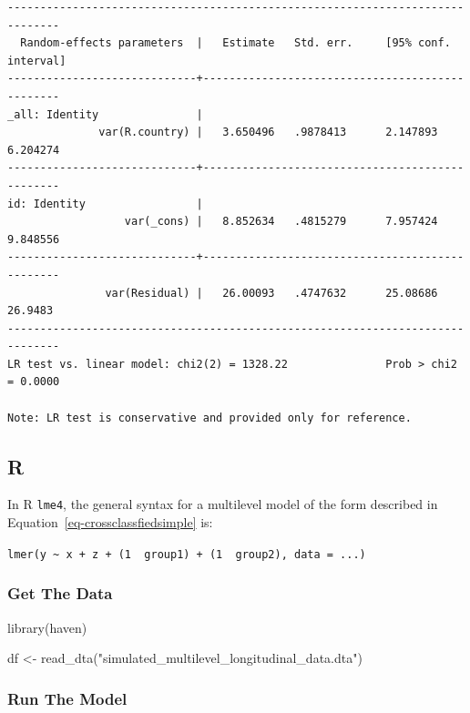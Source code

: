 \documentclass[
  letterpaper,
  DIV=11,
  numbers=noendperiod,
  oneside]{scrreprt}
\newenvironment{Shaded}{\begin{snugshade}}{\end{snugshade}}
\newcommand{\FunctionTok}[1]{\textcolor[rgb]{0.28,0.35,0.67}{#1}}
\newcommand{\NormalTok}[1]{\textcolor[rgb]{0.00,0.23,0.31}{#1}}
\newcommand{\OtherTok}[1]{\textcolor[rgb]{0.00,0.23,0.31}{#1}}
\newcommand{\StringTok}[1]{\textcolor[rgb]{0.13,0.47,0.30}{#1}}
\begin{document}
\begin{verbatim}
------------------------------------------------------------------------------
  Random-effects parameters  |   Estimate   Std. err.     [95% conf. interval]
-----------------------------+------------------------------------------------
_all: Identity               |
              var(R.country) |   3.650496   .9878413      2.147893    6.204274
-----------------------------+------------------------------------------------
id: Identity                 |
                  var(_cons) |   8.852634   .4815279      7.957424    9.848556
-----------------------------+------------------------------------------------
               var(Residual) |   26.00093   .4747632      25.08686     26.9483
------------------------------------------------------------------------------
LR test vs. linear model: chi2(2) = 1328.22               Prob > chi2 = 0.0000

Note: LR test is conservative and provided only for reference.
\end{verbatim}

\subsection{R}

In R \texttt{lme4}, the general syntax for a multilevel model of the
form described in Equation~\ref{eq-crossclassfiedsimple} is:

\texttt{lmer(y\ \textasciitilde{}\ x\ +\ z\ +\ (1\ \textbar{}\ group1)\ +\ (1\ \textbar{}\ group2),\ data\ =\ ...)}

\hypertarget{get-the-data-3}{%
\subsubsection{Get The Data}\label{get-the-data-3}}

\begin{Shaded}
\begin{Highlighting}[]
\FunctionTok{library}\NormalTok{(haven)}

\NormalTok{df }\OtherTok{\textless{}{-}} \FunctionTok{read\_dta}\NormalTok{(}\StringTok{"simulated\_multilevel\_longitudinal\_data.dta"}\NormalTok{)}
\end{Highlighting}
\end{Shaded}

\hypertarget{run-the-model-4}{%
\subsubsection{Run The Model}\label{run-the-model-4}}
\end{document}

